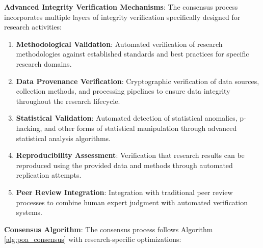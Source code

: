 \documentclass[10pt,twocolumn]{article}
\begin{document}
\textbf{Advanced Integrity Verification Mechanisms}: The consensus process incorporates multiple layers of integrity verification specifically designed for research activities:

\begin{enumerate}
    \item \textbf{Methodological Validation}: Automated verification of research methodologies against established standards and best practices for specific research domains.
    
    \item \textbf{Data Provenance Verification}: Cryptographic verification of data sources, collection methods, and processing pipelines to ensure data integrity throughout the research lifecycle.
    
    \item \textbf{Statistical Validation}: Automated detection of statistical anomalies, p-hacking, and other forms of statistical manipulation through advanced statistical analysis algorithms.
    
    \item \textbf{Reproducibility Assessment}: Verification that research results can be reproduced using the provided data and methods through automated replication attempts.
    
    \item \textbf{Peer Review Integration}: Integration with traditional peer review processes to combine human expert judgment with automated verification systems.
\end{enumerate}

\textbf{Consensus Algorithm}: The consensus process follows Algorithm \ref{alg:poa_consensus} with research-specific optimizations:
\end{document}

